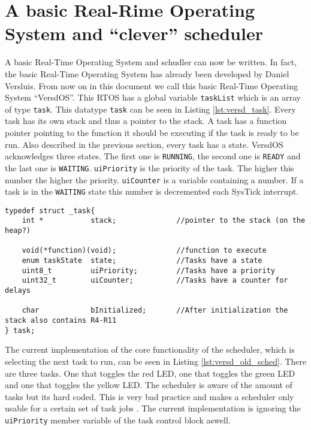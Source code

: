 \section{A basic Real-Rime Operating System and \enquote{clever} scheduler}

A basic Real-Time Operating System and schudler can now be written.
In fact, the basic Real-Time Operating System has already been developed by Daniel Versluis.
From now on in this document we call this basic Real-Time Operating System \enquote{VersdOS}.
This RTOS has a global variable \texttt{taskList} which is an array of type \texttt{task}.
This datatype \texttt{task} can be seen in Listing \ref{lst:versd_task}.
Every task has its own stack and thus a pointer to the stack.
A task has a function pointer pointing to the function it should be executing if the task is ready to be run.
Also described in the previous section, every task has a state. VersdOS acknowledges three states. 
The first one is \texttt{RUNNING}, the second one is \texttt{READY} and the last one is \texttt{WAITING}.
\texttt{uiPriority} is the priority of the task. The higher this number the higher the priority.
\texttt{uiCounter} is a variable containing a number. If a task is in the \texttt{WAITING} state this number is decremented each SysTick interrupt.

\begin{lstlisting}[style=CStyle, caption={Task control block for VersdOS}, captionpos=b, label={lst:versd_task}, escapechar=@]
typedef struct _task{
	int * 			stack; 				//pointer to the stack (on the heap?)

	void(*function)(void);				//function to execute
	enum taskState	state;				//Tasks have a state
	uint8_t 		uiPriority;			//Tasks have a priority
	uint32_t		uiCounter;			//Tasks have a counter for delays

	char			bInitialized;		//After initialization the stack also contains R4-R11
} task;
\end{lstlisting}

The current implementation of the core functionality of the scheduler, which is selecting the next task to run, can be seen in Listing \ref{lst:versd_old_sched}.
There are three tasks. One that toggles the red LED, one that toggles the green LED and one that toggles the yellow LED.
The scheduler is aware of the amount of tasks but its hard coded. This is very bad practice and makes a scheduler only usable for a certain set of task jobs \cite{IntroEmbeddedRtosSystems}.
The current implementation is ignoring the \texttt{uiPriority} member variable of the task control block aswell.

